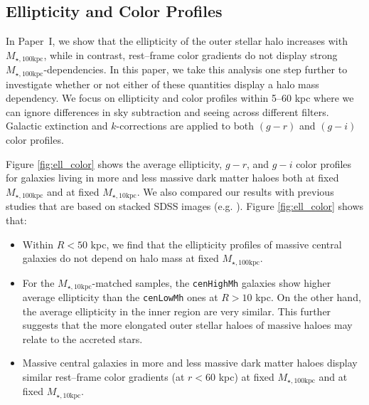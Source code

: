 \documentclass[a4paper,fleqn,usenatbib]{mnras}
\def\rbcg{\texttt{cenHighMh}}
\def\nbcg{\texttt{cenLowMh}}
\def\minn{{$M_{\star,10\mathrm{kpc}}$}}
\def\mtot{{$M_{\star,100\mathrm{kpc}}$}}
\begin{document}
\subsection{Ellipticity and Color Profiles}
    \label{ssec:ell_color}
    
    In Paper~I, we show that the ellipticity of the outer stellar halo increases with
    \mtot{}, while in contrast, rest--frame color gradients do not display strong 
    \mtot{}-dependencies. 
    In this paper, we take this analysis one step further to investigate whether or 
    not either of these quantities display a halo mass dependency. 
    We focus on ellipticity and color profiles within 5--60 kpc where we can ignore
    differences in sky subtraction and seeing across different filters. 
    Galactic extinction and $k$-corrections are applied to both $(g-r)$ and $(g-i)$ 
    color profiles.
    
    Figure \ref{fig:ell_color} shows the average ellipticity, $g-r$, and $g-i$ color 
    profiles for galaxies living in more and less massive dark matter haloes both at 
    fixed \mtot{} and at fixed \minn{}. 
    We also compared our results with previous studies that are based on stacked SDSS 
    images (e.g. \citealt{LaBarbera2010, Tal2011, DSouza2014}). 
    Figure \ref{fig:ell_color} shows that: 
    
    \begin{itemize}
        \item Within $R<50$ kpc, we find that the ellipticity profiles of massive 
            central galaxies do not depend on halo mass at fixed \mtot{}.        
                
        \item For the \minn{}-matched samples, the \rbcg{} galaxies show higher
            average ellipticity than the \nbcg{} ones at $R > 10$ kpc. 
            On the other hand, the average ellipticity in the inner region are very 
            similar. 
            This further suggests that the more elongated outer stellar haloes 
            of massive haloes may relate to the accreted stars.
                     
        \item Massive central galaxies in more and less massive dark matter haloes 
            display similar rest--frame color gradients (at $r<60$ kpc) at fixed 
            \mtot{} and at fixed  \minn{}.    
            
    \end{itemize}
    
\end{document}
